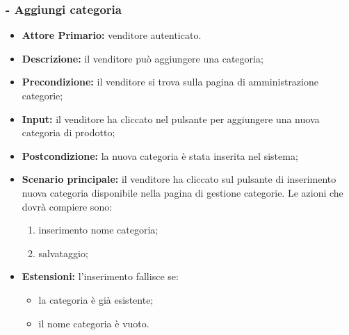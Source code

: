 \stepsubUserCase
\subsubsection{- Aggiungi categoria}
\begin{itemize}
    \item \textbf{Attore Primario:} venditore autenticato.
    \item \textbf{Descrizione:} il venditore può aggiungere una categoria;
    \item \textbf{Precondizione:} il venditore si trova sulla pagina di amministrazione categorie;
    \item \textbf{Input:} il venditore ha cliccato nel pulsante per aggiungere una nuova categoria di prodotto;
    \item \textbf{Postcondizione:} la nuova categoria è stata inserita nel sistema;
    \item \textbf{Scenario principale:} il venditore ha cliccato sul pulsante di inserimento nuova categoria disponibile nella pagina di gestione categorie. Le azioni che dovrà compiere sono:
    \begin{enumerate}
        \item inserimento nome categoria;
        \item salvataggio;
    \end{enumerate}
    \item \textbf{Estensioni:} l'inserimento fallisce se:
    \begin{itemize}
        \item la categoria è già esistente;
        \item il nome categoria è vuoto.
    \end{itemize}
\end{itemize}

\stepsubUserCase
